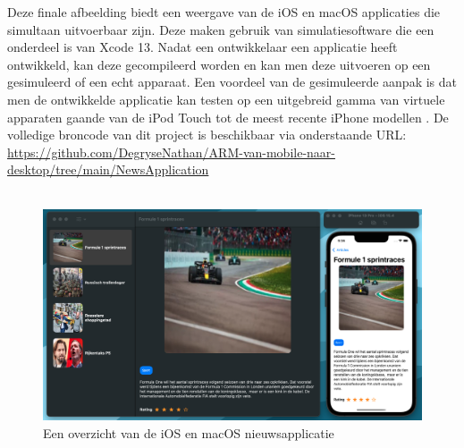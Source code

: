 \pagebreak
Deze finale afbeelding biedt een weergave van de iOS en macOS applicaties die simultaan uitvoerbaar zijn. Deze maken gebruik van simulatiesoftware die een onderdeel is van Xcode 13. Nadat een ontwikkelaar een applicatie heeft ontwikkeld, kan deze gecompileerd worden en kan men deze uitvoeren op een gesimuleerd of een echt apparaat. Een voordeel van de gesimuleerde aanpak is dat men de ontwikkelde applicatie kan testen op een uitgebreid gamma van virtuele apparaten gaande van de iPod Touch tot de meest recente iPhone modellen \autocite{AppleDeveloper2021}. De volledige broncode van dit project is beschikbaar via onderstaande URL: \url{https://github.com/DegryseNathan/ARM-van-mobile-naar-desktop/tree/main/NewsApplication}
\\\\
\begin{figure}[!h]
    \centering
    \includegraphics[width=\linewidth]{img/iosenmacosapplicatie.png}
    \caption{Een overzicht van de iOS en macOS nieuwsapplicatie}
\end{figure}
